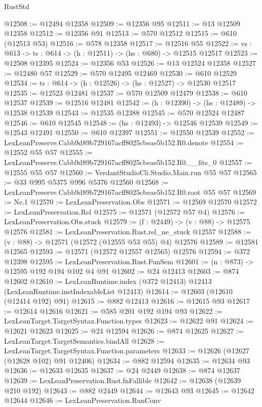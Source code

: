 \begin{lexlean}{RustStd}
\begin{coremodule}
@12508 := @12494 @12358
@12509 := @12356 @95
@12511 := @13 @12509 @12358
@12512 := @12356 @91
@12513 := @570 @12512
@12515 := @610 (@12513 @53)
@12516 := @578 @12358
@12517 := @12516 @55
@12522 := {vs : @613} -> {ts : @614} -> (h : @12511) -> (hs : @680) -> @12515 @12517
@12523 := @12508 @12395
@12524 := @12356 @53
@12526 := @13 @12524 @12358
@12527 := @12480 @57
@12529 := @570 @12495 @12469
@12530 := @610 @12529
@12534 := {ts : @614} -> (h : @12526) -> (hs : @12527) -> @12530 @12517
@12535 := @12523 @12481
@12537 := @570 @12509 @12479
@12538 := @610 @12537
@12539 := @12516 @12481
@12542 := (h : @12390) -> (hs : @12489) -> @12538 @12539
@12543 := @12535 @12388
@12545 := @570 @12524 @12487
@12546 := @610 @12545
@12548 := (hs : @12493) -> @12546 @12539
@12549 := @12543 @12491
@12550 := @610 @12397
@12551 := @12550 @12539
@12552 := LexLeanPreserve.Cabb9d89b729167acff8025cbeae5b152.R0.denote
@12554 := @12552 @55 @57
@12555 := LexLeanPreserve.Cabb9d89b729167acff8025cbeae5b152.R0.__fits_0
@12557 := @12555 @55 @57
@12560 := VerdantStudioCli.Studio.Main.run @55 @57
@12565 := @33 @995 @5375 @996 @5376 @12560
@12568 := LexLeanPreserve.Cabb9d89b729167acff8025cbeae5b152.R0.root @55 @57
@12569 := Ne.{1}
@12570 := LexLeanPreservation.Obs
@12571 := @12569 @12570
@12572 := LexLeanPreservation.Rel
@12575 := @12571 (@12572 @57 @4)
@12576 := LexLeanPreservation.Obs.stuck
@12579 := (f : @2449) -> (v : @88) -> @12575 @12576
@12581 := LexLeanPreservation.Rust.rel_ne_stuck @12557
@12588 := (v : @88) -> @12571 (@12572 (@12555 @53 @55) @4) @12576
@12589 := @12581 @12565
@12593 := @12571 (@12572 @12557 @12565) @12576
@12594 := @372 @12398
@12595 := LexLeanPreservation.Rust.FunSem
@12601 := (n : @873) -> @12595 @192 @194 @102 @4 @91
@12602 := @24 @12413
@12603 := @874 @12602
@12610 := LexLeanRuntime.index (@372 @12413) @12413 (LexLeanRuntime.instIndexableList @12413)
@12614 := @12603 (@12610 (@12414 @192) @91)
@12615 := @882 @12413
@12616 := @12615 @93
@12617 := @12614 @12616
@12621 := @585 @201 @192 @194 @93
@12622 := LexLeanTarget.TargetSyntax.Function.types
@12623 := @12622 @91
@12624 := @12621 @12623
@12625 := @24 @12594
@12626 := @874 @12625
@12627 := LexLeanTarget.TargetSemantics.bindAll
@12628 := LexLeanTarget.TargetSyntax.Function.parameters
@12633 := @12626 (@12627 (@12628 @102) @91 @12406)
@12634 := @882 @12594
@12635 := @12634 @93
@12636 := @12633 @12635
@12637 := @24 @2449
@12638 := @874 @12637
@12639 := LexLeanPreservation.Rust.fnFallible
@12642 := @12638 (@12639 @210 @192)
@12643 := @882 @2449
@12644 := @12643 @93
@12645 := @12642 @12644
@12646 := LexLeanPreservation.RunConv

\end{coremodule}
\end{lexlean}
